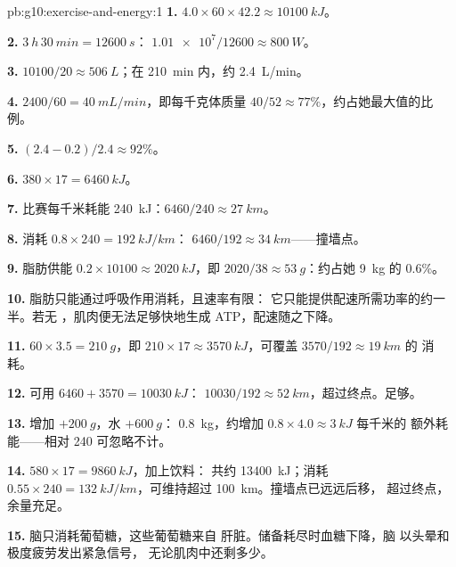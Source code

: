 \begin{solution}{pb:g10:exercise-and-energy:1}
\textbf{1.} $4.0 \times 60 \times 42.2 \approx \qty{10100}{kJ}$。

\textbf{2.} $\qty{3}{h}\,\qty{30}{min} = \qty{12600}{s}$：
$\num{1.01e7}/12600 \approx \qty{800}{W}$。

\textbf{3.} $10100/20 \approx \qty{506}{L}$；在 \qty{210}{min} 内，约
\qty{2.4}{L/min}。

\textbf{4.} $2400/60 = \qty{40}{mL/min}$，即每千克体质量 $40/52
\approx 77\%$，约占她最大值的比例。

\textbf{5.} $(2.4 - 0.2)/2.4 \approx 92\%$。

\textbf{6.} $380 \times 17 = \qty{6460}{kJ}$。

\textbf{7.} 比赛每千米耗能 \qty{240}{kJ}：$6460/240
\approx \qty{27}{km}$。

\textbf{8.} 消耗 $0.8 \times 240 = \qty{192}{kJ/km}$：
$6460/192 \approx \qty{34}{km}$——撞墙点。

\textbf{9.} 脂肪供能 $0.2 \times 10100 \approx \qty{2020}{kJ}$，即
$2020/38 \approx \qty{53}{g}$：约占她 \qty{9}{kg} 的 0.6\%。

\textbf{10.} 脂肪只能通过呼吸作用消耗，且速率有限：
它只能提供配速所需功率的约一半。若无
，肌肉便无法足够快地生成 ATP，配速随之下降。

\textbf{11.} $60 \times 3.5 = \qty{210}{g}$，即 $210 \times 17 \approx
\qty{3570}{kJ}$，可覆盖 $3570/192 \approx \qty{19}{km}$ 的
消耗。

\textbf{12.} 可用 $6460 + 3570 = \qty{10030}{kJ}$：
$10030/192 \approx \qty{52}{km}$，超过终点。足够。

\textbf{13.} 增加 $+\qty{200}{g}$，水 $+ \qty{600}{g}$：
\qty{0.8}{kg}，约增加 $0.8 \times 4.0 \approx \qty{3}{kJ}$ 每千米的
额外耗能——相对 240 可忽略不计。

\textbf{14.}  $580 \times 17 = \qty{9860}{kJ}$，加上饮料：
共约 \qty{13400}{kJ}；消耗 $0.55 \times 240 =
\qty{132}{kJ/km}$，可维持超过 \qty{100}{km}。撞墙点已远远后移，
超过终点，余量充足。

\textbf{15.} 脑只消耗葡萄糖，这些葡萄糖来自
肝脏。储备耗尽时血糖下降，脑
以头晕和极度疲劳发出紧急信号，
无论肌肉中还剩多少。


\end{solution}
